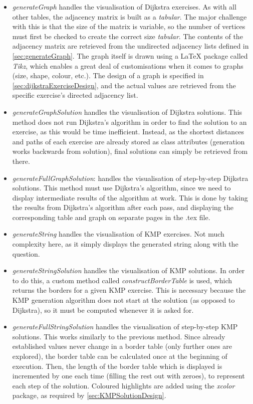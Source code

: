 \documentclass{l4proj}
\begin{document}
\begin{itemize}
	\item
	\emph{generateGraph} handles the visualisation of Dijkstra exercises. As with all other tables, the adjacency matrix is built as a \emph{tabular}. The major challenge with this is that the size of the matrix is variable, so the number of vertices must first be checked to create the correct size \emph{tabular}. The contents of the adjacency matrix are retrieved from the undirected adjacency lists defined in \autoref{sec:generateGraph}. The graph itself is drawn using a LaTeX package called \emph{Tikz}, which enables a great deal of customisations when it comes to graphs (size, shape, colour, etc.). The design of a graph is specified in \autoref{sec:dijkstraExerciseDesign}, and the actual values are retrieved from the specific exercise's directed adjacency list.
	\item
	\emph{generateGraphSolution} handles the visualisation of Dijkstra solutions. This method does not run Dijkstra's algorithm in order to find the solution to an exercise, as this would be time inefficient. Instead, as the shortest distances and paths of each exercise are already stored as class attributes (generation works backwards from solution), final solutions can simply be retrieved from there.
	\item
	\emph{generateFullGraphSolution}: handles the visualisation of step-by-step Dijkstra solutions. This method must use Dijkstra's algorithm, since we need to display intermediate results of the algorithm at work. This is done by taking the results from Dijkstra's algorithm after each pass, and displaying the corresponding table and graph on separate pages in the .tex file.  
	\item
	\emph{generateString} handles the visualisation of KMP exercises. Not much complexity here, as it simply displays the generated string along with the question.
	\item
	\emph{generateStringSolution} handles the visualisation of KMP solutions. In order to do this, a custom method called \emph{constructBorderTable} is used, which returns the borders for a given KMP exercise. This is necessary because the KMP generation algorithm does not start at the solution (as opposed to Dijkstra), so it must be computed whenever it is asked for.
	\item
	\emph{generateFullStringSolution} handles the visualisation of step-by-step KMP solutions. This works similarly to the previous method. Since already established values never change in a border table (only further ones are explored), the border table can be calculated once at the beginning of execution. Then, the length of the border table which is displayed is incremented by one each time (filling the rest out with zeroes), to represent each step of the solution. Coloured highlights are added using the \emph{xcolor} package, as required by \autoref{sec:KMPSolutionDesign}.
\end{itemize}
\end{document}
